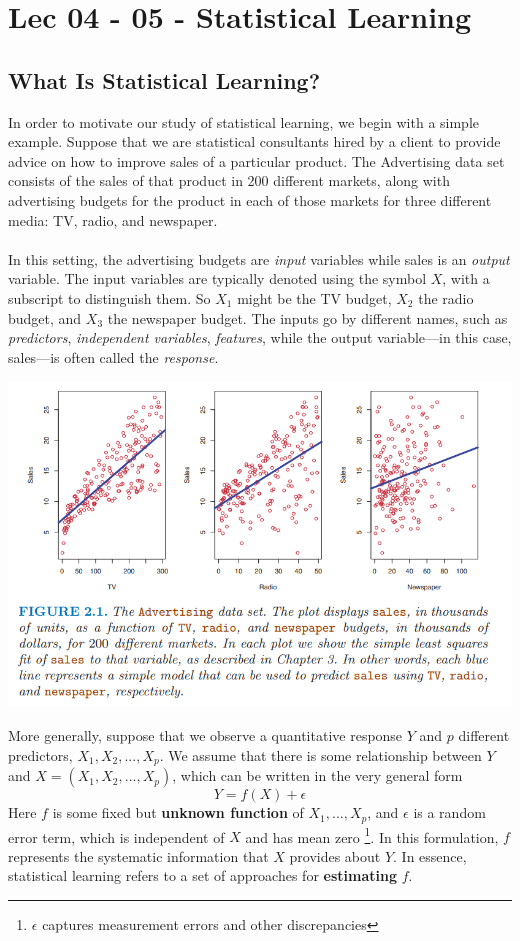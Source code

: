 \chapter{Lec 04 - 05 - Statistical Learning}

\maketitle

\section{What Is Statistical Learning?}
In order to motivate our study of statistical learning, we begin with a simple example. Suppose that we are statistical consultants hired by a client to provide advice on how to improve sales of a particular product. The Advertising data set consists of the sales of that product in 200 different markets, along with advertising budgets for the product in each of those markets for three different media: TV, radio, and newspaper.\\\\
In this setting, the advertising budgets are \textit{input} variables while sales is an \textit{output} variable. The input variables are typically denoted using the symbol $X$, with a subscript to distinguish them. So $X_1$ might be the TV budget, $X_2$ the radio budget, and $X_3$ the newspaper budget. The inputs go by different names, such as \textit{predictors}, \textit{independent variables}, \textit{features}, while the output variable—in this case, sales—is often called the \textit{response}.
\begin{center}
    \includegraphics[scale=0.8]{images/tv adv.png}
\end{center}
More generally, suppose that we observe a quantitative response $Y$ and $p$
different predictors, $X_1, X_2,...,X_p$. We assume that there is some
relationship between $Y$ and $X = (X_1, X_2,...,X_p)$, which can be written
in the very general form
\[Y = f(X) + \epsilon\]
Here $f$ is some fixed but \textbf{unknown function} of $X_1,...,X_p$, and $\epsilon$ is a random error term, which is independent of $X$ and has mean zero \footnote{ $\epsilon$ captures measurement errors and other discrepancies}.  In this formulation, $f$ represents the systematic information that $X$ provides about $Y$. In essence, statistical learning refers to a set of approaches for \textbf{estimating}
$f$. 


